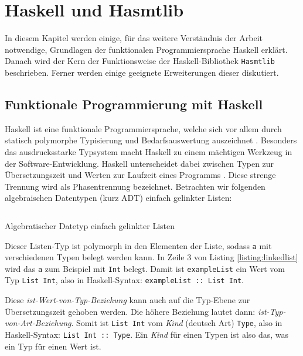 \chapter{Haskell und Hasmtlib}
\label{chapter:haskell}
In diesem Kapitel werden einige, für das weitere Verständnis der Arbeit notwendige, Grundlagen der funktionalen Programmiersprache Haskell erklärt.
Danach wird der Kern der Funktionsweise der Haskell-Bibliothek \texttt{Hasmtlib} \cite{hasmtlib} beschrieben.
Ferner werden einige geeignete Erweiterungen dieser diskutiert.

\section{Funktionale Programmierung mit Haskell}
\label{sec:haskell}
Haskell ist eine funktionale Programmiersprache, welche sich vor allem durch statisch polymorphe Typisierung und Bedarfsauswertung auszeichnet \cite{haskell2010report}.
Besonders das ausdrucksstarke Typsystem macht Haskell zu einem mächtigen Werkzeug in der Software-Entwicklung.
Haskell unterscheidet dabei zwischen Typen zur Übersetzungszeit und Werten zur Laufzeit eines Programms \cite{singletons}.
Diese strenge Trennung wird als Phasentrennung bezeichnet.
Betrachten wir folgenden algebraischen Datentypen (kurz \gls{ADT}) einfach gelinkter Listen:
\begin{listing}[H]
    \inputminted[linenos=true]{haskell}{Code/Implementierung/Haskell/List.hs}
    \caption{Algebratischer Datetyp einfach gelinkter Listen}
    \label{listing:linkedlist}
\end{listing}
Dieser Listen-Typ ist polymorph in den Elementen der Liste, sodass \texttt{a} mit verschiedenen Typen belegt werden kann.
In Zeile 3 von Listing \ref{listing:linkedlist} wird das \texttt{a} zum Beispiel mit \texttt{Int} belegt.
Damit ist \texttt{exampleList} ein Wert vom Typ \texttt{List Int}, also in Haskell-Syntax: \texttt{exampleList :: List Int}.

Diese \textit{ist-Wert-von-Typ-Beziehung} kann auch auf die Typ-Ebene zur Übersetzungszeit gehoben werden.
Die höhere Beziehung lautet dann: \textit{ist-Typ-von-Art-Beziehung}.
Somit ist \texttt{List Int} vom \textit{\gls{Kind}} (deutsch Art) \texttt{Type}, also in Haskell-Syntax: \texttt{List Int :: Type}.
Ein \textit{Kind} für einen Typen ist also das, was ein Typ für einen Wert ist.

